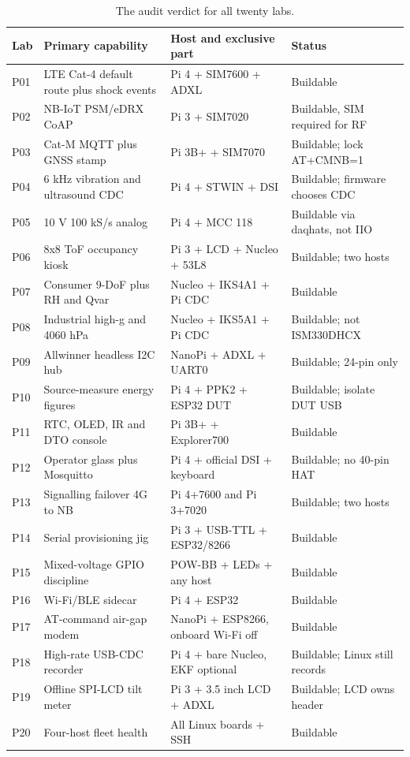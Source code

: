 \begin{table}[H]\centering\small
\begin{tabular}{p{8mm}p{44mm}p{40mm}p{52mm}}
\toprule
Lab & Primary capability & Host and exclusive part & Status \\
\midrule
P01 & LTE Cat-4 default route plus shock events & Pi 4 + SIM7600 + ADXL & Buildable \\
P02 & NB-IoT PSM/eDRX CoAP & Pi 3 + SIM7020 & Buildable, SIM required for RF \\
P03 & Cat-M MQTT plus GNSS stamp & Pi 3B+ + SIM7070 & Buildable; lock AT+CMNB=1 \\
P04 & 6 kHz vibration and ultrasound CDC & Pi 4 + STWIN + DSI & Buildable; firmware chooses CDC \\
P05 & 10 V 100 kS/s analog & Pi 4 + MCC 118 & Buildable via daqhats, not IIO \\
P06 & 8x8 ToF occupancy kiosk & Pi 3 + LCD + Nucleo + 53L8 & Buildable; two hosts \\
P07 & Consumer 9-DoF plus RH and Qvar & Nucleo + IKS4A1 + Pi CDC & Buildable \\
P08 & Industrial high-g and 4060 hPa & Nucleo + IKS5A1 + Pi CDC & Buildable; not ISM330DHCX \\
P09 & Allwinner headless I2C hub & NanoPi + ADXL + UART0 & Buildable; 24-pin only \\
P10 & Source-measure energy figures & Pi 4 + PPK2 + ESP32 DUT & Buildable; isolate DUT USB \\
P11 & RTC, OLED, IR and DTO console & Pi 3B+ + Explorer700 & Buildable \\
P12 & Operator glass plus Mosquitto & Pi 4 + official DSI + keyboard & Buildable; no 40-pin HAT \\
P13 & Signalling failover 4G to NB & Pi 4+7600 and Pi 3+7020 & Buildable; two hosts \\
P14 & Serial provisioning jig & Pi 3 + USB-TTL + ESP32/8266 & Buildable \\
P15 & Mixed-voltage GPIO discipline & POW-BB + LEDs + any host & Buildable \\
P16 & Wi-Fi/BLE sidecar & Pi 4 + ESP32 & Buildable \\
P17 & AT-command air-gap modem & NanoPi + ESP8266, onboard Wi-Fi off & Buildable \\
P18 & High-rate USB-CDC recorder & Pi 4 + bare Nucleo, EKF optional & Buildable; Linux still records \\
P19 & Offline SPI-LCD tilt meter & Pi 3 + 3.5 inch LCD + ADXL & Buildable; LCD owns header \\
P20 & Four-host fleet health & All Linux boards + SSH & Buildable \\
\bottomrule
\end{tabular}
\caption{The audit verdict for all twenty labs.}
\end{table}

